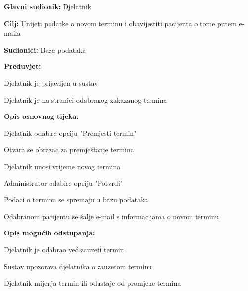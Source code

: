 				\noindent {}
				\begin{packed_item}
					
					\item \textbf{Glavni sudionik: }Djelatnik
					\item  \textbf{Cilj: }Unijeti podatke o novom terminu i obavijestiti pacijenta o tome putem e-maila 
					\item  \textbf{Sudionici: }Baza podataka
					\item  \textbf{Preduvjet: }
					\item[] \begin{packed_enum}
						
						\item[-] Djelatnik je prijavljen u sustav
						\item[-] Djelatnik je na stranici odabranog zakazanog termina
					\end{packed_enum}
					\item  \textbf{Opis osnovnog tijeka: }
					
					\item[] \begin{packed_enum}
						\item Djelatnik odabire opciju "Premjesti termin"
						\item Otvara se obrazac za premještanje termina
						\item Djelatnik unosi vrijeme novog termina
						\item Administrator odabire opciju "Potvrdi"
						\item Podaci o terminu se spremaju u bazu podataka
						\item Odabranom pacijentu se šalje e-mail s informacijama o novom terminu
					\end{packed_enum}
					
					\item  \textbf{Opis mogućih odstupanja:}
					
					\item[] \begin{packed_item}
						
						\item[4.a] Djelatnik je odabrao već zauzeti termin
						\item[] \begin{packed_enum}
							\item Sustav upozorava djelatnika o zauzetom terminu
							\item Djelatnik mijenja termin ili odustaje od promjene termina
						\end{packed_enum}
					\end{packed_item}
				\end{packed_item}
				

